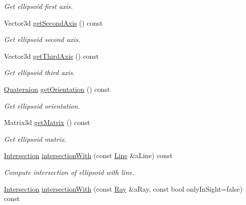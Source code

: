 \begin{DoxyCompactItemize}
\begin{DoxyCompactList}\small\item\em Get ellipsoid first axis. \end{DoxyCompactList}\item 
Vector3d \hyperlink{classlibrary_1_1math_1_1geom_1_1d3_1_1objects_1_1_ellipsoid_a33dde96894c213da77ee116ff18fdf86}{get\+Second\+Axis} () const
\begin{DoxyCompactList}\small\item\em Get ellipsoid second axis. \end{DoxyCompactList}\item 
Vector3d \hyperlink{classlibrary_1_1math_1_1geom_1_1d3_1_1objects_1_1_ellipsoid_a12dc0fd72c672b3d78ec9a286db30c70}{get\+Third\+Axis} () const
\begin{DoxyCompactList}\small\item\em Get ellipsoid third axis. \end{DoxyCompactList}\item 
\hyperlink{classlibrary_1_1math_1_1geom_1_1trf_1_1rot_1_1_quaternion}{Quaternion} \hyperlink{classlibrary_1_1math_1_1geom_1_1d3_1_1objects_1_1_ellipsoid_a8d426da587827eff577de4edb58ae417}{get\+Orientation} () const
\begin{DoxyCompactList}\small\item\em Get ellipsoid orientation. \end{DoxyCompactList}\item 
Matrix3d \hyperlink{classlibrary_1_1math_1_1geom_1_1d3_1_1objects_1_1_ellipsoid_ae6af9f16762e8c38b0a71c306d29ddbf}{get\+Matrix} () const
\begin{DoxyCompactList}\small\item\em Get ellipsoid matrix. \end{DoxyCompactList}\item 
\hyperlink{classlibrary_1_1math_1_1geom_1_1d3_1_1_intersection}{Intersection} \hyperlink{classlibrary_1_1math_1_1geom_1_1d3_1_1objects_1_1_ellipsoid_a5a043a5a0ad0c68771902824c9ea0190}{intersection\+With} (const \hyperlink{classlibrary_1_1math_1_1geom_1_1d3_1_1objects_1_1_line}{Line} \&a\+Line) const
\begin{DoxyCompactList}\small\item\em Compute intersection of ellipsoid with line. \end{DoxyCompactList}\item 
\hyperlink{classlibrary_1_1math_1_1geom_1_1d3_1_1_intersection}{Intersection} \hyperlink{classlibrary_1_1math_1_1geom_1_1d3_1_1objects_1_1_ellipsoid_a2a7c282ac6d4b54210582953e37c8ab5}{intersection\+With} (const \hyperlink{classlibrary_1_1math_1_1geom_1_1d3_1_1objects_1_1_ray}{Ray} \&a\+Ray, const bool only\+In\+Sight=false) const

\end{DoxyCompactItemize}
